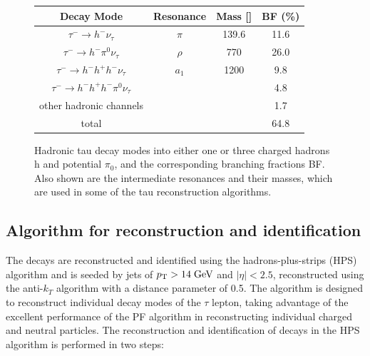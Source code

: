 \begin{figure}[tbh!]
	\begin{center}	
		\begin{tabular}{ | c | c | c | c |}
			\hline
			Decay Mode & Resonance & Mass [\mev] & BF (\%) \\ \hline
			\hline
			$\tau^{-}\longrightarrow h^{-}\nu_{\tau}$& $\pi$ & 139.6 & 11.6 \\ \hline
			$\tau^{-}\longrightarrow h^{-}\pi^{0}\nu_{\tau}$& $\rho$ & 770 & 26.0 \\ \hline
			$\tau^{-}\longrightarrow h^{-} h^{+} h^{-} \nu_{\tau}$& $a_{1}$& 1200 & 9.8 \\ \hline
			$\tau^{-}\longrightarrow h^{-} h^{+} h^{-} \pi^{0}\nu_{\tau}$& & & 4.8 \\ \hline
			other hadronic channels& & & 1.7 \\ \hline
			\hline
			total & & & 64.8 \\ \hline
			\hline
		\end{tabular}
		\caption{ Hadronic tau decay modes into either one or three charged hadrons h and potential $\pi_{0}$, and the corresponding branching fractions BF. Also shown are the intermediate resonances and their masses, which are used in some of the tau reconstruction algorithms.}
		\label{table:tau_hdecay}
	\end{center}
\end{figure}

\subsection{Algorithm for \hadtau reconstruction and identiﬁcation}

The \hadtau decays are reconstructed and identified using the hadrons-plus-strips (HPS) algorithm \cite{Chatrchyan:2012zz} and is seeded by jets of \ensuremath{\pt > 14 \gev} and \ensuremath{|\eta| < 2.5}, reconstructed using the anti-\ensuremath{k_{T}} algorithm \cite{antikt} with a distance parameter of 0.5. The algorithm is designed to reconstruct individual decay modes of the \ensuremath{\tau} lepton, taking advantage of the excellent performance of the PF algorithm in reconstructing individual charged and neutral particles.
The reconstruction and identification of \hadtau decays in the HPS algorithm is performed in two steps:

